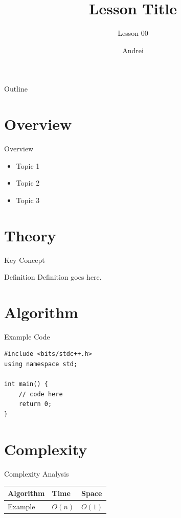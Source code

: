 \documentclass{beamer}
\title{Lesson Title}
\subtitle{Lesson 00}
\author{Andrei}
\institute{Algolymp Summer School}
\date{}
\begin{document}
\begin{frame}
  \titlepage
\end{frame}

\begin{frame}{Outline}
  \tableofcontents
\end{frame}

\section{Overview}

\begin{frame}{Overview}
  \begin{itemize}
    \item Topic 1
    \item Topic 2
    \item Topic 3
  \end{itemize}
\end{frame}

\section{Theory}

\begin{frame}{Key Concept}
  \begin{block}{Definition}
    Definition goes here.
  \end{block}
\end{frame}

\section{Algorithm}

\begin{frame}{Example Code}
  \begin{lstlisting}[caption={Example C++ code}]
#include <bits/stdc++.h>
using namespace std;

int main() {
    // code here
    return 0;
}
  \end{lstlisting}
\end{frame}

\section{Complexity}

\begin{frame}{Complexity Analysis}
  \begin{center}
  \begin{tabular}{lll}
    \toprule
    Algorithm & Time & Space \\
    \midrule
    Example   & $O(n)$ & $O(1)$ \\
    \bottomrule
  \end{tabular}
  \end{center}
\end{frame}

\end{document}
